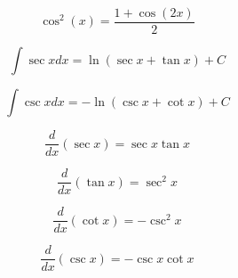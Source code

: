 \documentclass[a4paper,9pt]{scrartcl}
\begin{document}
    \begin{displaymath}
        \cos^2(x) = \frac{1+\cos(2x)}{2}
    \end{displaymath}

    \begin{displaymath}
        \int{\sec{x}}dx = \ln{(\sec{x} + \tan{x})} + C
    \end{displaymath}

    \begin{displaymath}
        \int{\csc{x}}dx = -\ln({\csc{x} + \cot{x}}) + C
    \end{displaymath}

    \begin{displaymath}
        \frac{d}{dx}(\sec{x}) = \sec{x}\tan{x}
    \end{displaymath}

    \begin{displaymath}
        \frac{d}{dx}(\tan{x}) = \sec^2{x}
    \end{displaymath}

    \begin{displaymath}
        \frac{d}{dx}(\cot{x}) = -\csc^2{x}
    \end{displaymath}

    \begin{displaymath}
        \frac{d}{dx}(\csc{x}) = -\csc{x}\cot{x}
    \end{displaymath}
\end{document}
